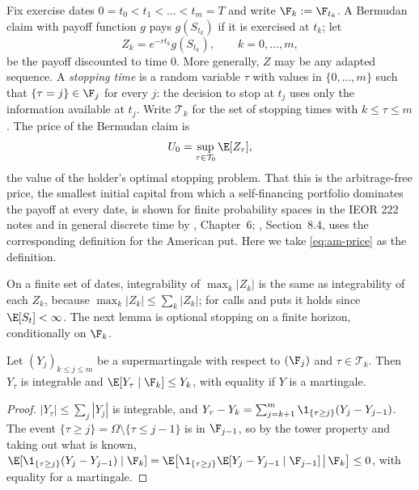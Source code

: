 Fix exercise dates $0=t_0<t_1<\dots<t_m=T$ and write $\F_k:=\F_{t_k}$. A Bermudan claim
with payoff function $g$ pays $g(S_{t_k})$ if it is exercised at $t_k$; let
\[
  Z_k=e^{-rt_k}g(S_{t_k}),\qquad k=0,\dots,m,
\]
be the payoff discounted to time $0$. More generally, $Z$ may be any adapted sequence. A
\emph{stopping time} is a random variable $\tau$ with values in $\{0,\dots,m\}$ such that
$\{\tau=j\}\in\F_j$ for every $j$: the decision to stop at $t_j$ uses only the information
available at $t_j$. Write $\mathcal T_k$ for the set of stopping times with $k\le\tau\le m$.
The price of the Bermudan claim is
\begin{equation}\label{eq:am-price}
  U_0=\sup_{\tau\in\mathcal T_0}\E[Z_\tau],
\end{equation}
the value of the holder's optimal stopping problem. That this is the arbitrage-free price,
the smallest initial capital from which a self-financing portfolio dominates the payoff at
every date, is shown for finite probability spaces in the IEOR 222 notes and in general
discrete time by \textcite{follmer-schied}, Chapter~6; \textcite{shreve2}, Section~8.4,
uses the corresponding definition for the American put. Here we take
\eqref{eq:am-price} as the definition.

On a finite set of dates, integrability of $\max_k|Z_k|$ is the same as integrability of
each $Z_k$, because $\max_k|Z_k|\le\sum_k|Z_k|$; for calls and puts it holds since
$\E[S_t]<\infty$. The next lemma is optional stopping on a finite horizon, conditionally on
$\F_k$.

\begin{lemma}\label{lem:am-optional}
Let $(Y_j)_{k\le j\le m}$ be a supermartingale with respect to $(\F_j)$ and
$\tau\in\mathcal T_k$. Then $Y_\tau$ is integrable and $\E[Y_\tau\mid\F_k]\le Y_k$, with
equality if $Y$ is a martingale.
\end{lemma}

\begin{proof}
$|Y_\tau|\le\sum_j|Y_j|$ is integrable, and $Y_\tau-Y_k=\sum_{j=k+1}^m\1_{\{\tau\ge
j\}}(Y_j-Y_{j-1})$. The event $\{\tau\ge j\}=\Omega\setminus\{\tau\le j-1\}$ is in
$\F_{j-1}$, so by the tower property and taking out what is known,
$\E[\1_{\{\tau\ge j\}}(Y_j-Y_{j-1})\mid\F_k]=\E\big[\1_{\{\tau\ge
j\}}\E[Y_j-Y_{j-1}\mid\F_{j-1}]\,\big|\,\F_k\big]\le0$, with equality for a martingale.
\end{proof}

